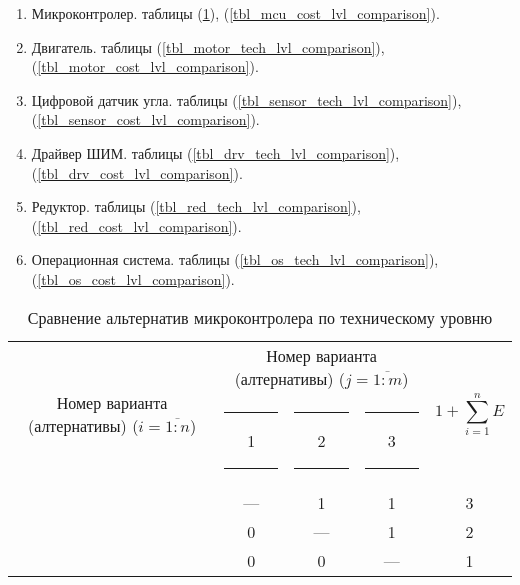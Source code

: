 \begin{enumerate}
    \item Микроконтролер. таблицы
        (\ref{tbl_mcu_tech_lvl_comparison}),
        (\ref{tbl_mcu_cost_lvl_comparison}).

    \item Двигатель. таблицы
        (\ref{tbl_motor_tech_lvl_comparison}),
        (\ref{tbl_motor_cost_lvl_comparison}).

    \item Цифровой датчик угла. таблицы
        (\ref{tbl_sensor_tech_lvl_comparison}),
        (\ref{tbl_sensor_cost_lvl_comparison}).

    \item Драйвер ШИМ. таблицы
        (\ref{tbl_drv_tech_lvl_comparison}),
        (\ref{tbl_drv_cost_lvl_comparison}).

    \item Редуктор. таблицы
        (\ref{tbl_red_tech_lvl_comparison}),
        (\ref{tbl_red_cost_lvl_comparison}).

    \item Операционная система. таблицы
        (\ref{tbl_os_tech_lvl_comparison}),
        (\ref{tbl_os_cost_lvl_comparison}).

\end{enumerate}

\begin{table}[H]
    \centering
    \begin{tabular}{|c|c|c|c|c|}
        \hline
        \multirow{2}{2.4cm}[-0.5pc]{
            \centering
            Номер варианта (алтернативы) ($i = \overline{1:n}$)
        } &
        \multicolumn{3}{c|}{
            \parbox[t]{2.4cm}{
                \centering
                Номер варианта (алтернативы) ($j = \overline{1:m}$)
            }
        } &
        \multirow{2}{1.7cm}{
            \centering
            $$1 + \sum_{i=1}^n E$$
        } \\
        &
        \centering \rule{2pt}{0pt} 1 \rule{2pt}{0pt} &
        \centering \rule{2pt}{0pt} 2 \rule{2pt}{0pt} &
        \centering \rule{2pt}{0pt} 3 \rule{2pt}{0pt} & \\
        \hline \hline
        \centering{1} &---& 1 & 1 & 3 \\ \hline
        \centering{2} & 0 &---& 1 & 2 \\ \hline
        \centering{3} & 0 & 0 &---& 1 \\ \hline
    \end{tabular}
    \caption{Сравнение альтернатив микроконтролера по техническому уровню}
    \label{tbl_mcu_tech_lvl_comparison}
\end{table}

